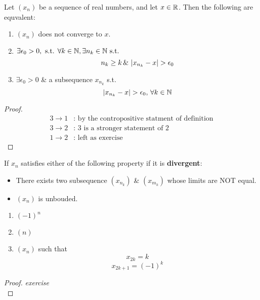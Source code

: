 \documentclass[a4paper,12pt]{article}
\begin{document}
    \begin{theorem}
        Let \((x_n)\) be a sequence of real numbers, and let \(x\in \mathbb{R}\). Then the following are equvalent:
        \begin{enumerate}
            \item \((x_n)\) does not converge to \(x\).
            \item \(\exists \epsilon_0 >0, \text{ s.t. } \forall k \in \mathbb{N}, \exists n_k \in \mathbb{N} \text{ s.t. }\) 
            \[n_k\ge k\, \&\, \left\lvert x_{n_k}-x\right\rvert>\epsilon_0\]
            \item \(\exists \epsilon_0 >0 \) \& a subsequence \(x_{n_k}\) s.t. \[\left\lvert x_{n_k}-x\right\rvert>\epsilon_0,\, \forall k \in \mathbb{N}\]
        \end{enumerate}
    \end{theorem}
    \begin{proof}
        \begin{align*}
            3\rightarrow1 &\text{: by the contropositive statment of definition} \\
            3\rightarrow2 &\text{: 3 is a stronger statement of 2} \\
            1\rightarrow2 &\text{: left as exercise}
        \end{align*}
    \end{proof}
    \begin{theorem}
        If \(x_n\) satisfies either of the following property if it is \textbf{divergent}:
        \begin{itemize}
            \item There exists two subsequence \((x_{n_k})\) \& \((x_{m_k})\) whose limits are NOT equal.
            \item \((x_n)\) is unbouded.
        \end{itemize}
    \end{theorem}
    \begin{example}
        \text{\\}
        \begin{enumerate}
            \item \((-1)^n\)
            \item \((n)\)
            \item \((x_n)\) such that \[x_{2k} = k\]\[x_{2k+1} = (-1)^k\]
        \end{enumerate}
    \end{example}
    \begin{proof}
        \textit{exercise}\\
    \end{proof}
\end{document}
